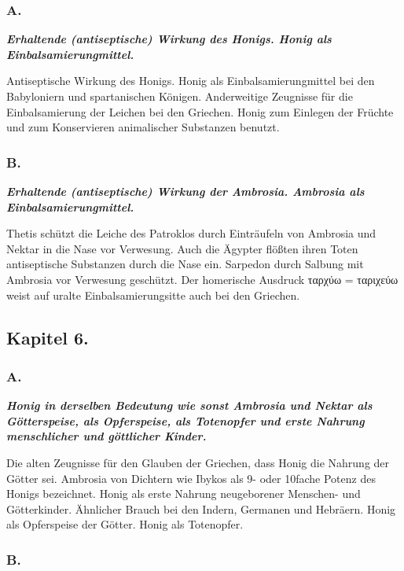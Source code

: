 \documentclass[a4paper, 11pt, oneside]{article}
\begin{document}
\subsubsection*{A.}

\textbf{\emph{Erhaltende (antiseptische) Wirkung des Honigs. Honig als Einbalsamierungmittel.}}

Antiseptische Wirkung des Honigs. Honig als Einbalsamierungmittel bei den Babyloniern und spartanischen Königen. Anderweitige Zeugnisse für die Einbalsamierung der Leichen bei den Griechen. Honig zum Einlegen der Früchte und zum Konservieren animalischer Substanzen benutzt.

\subsubsection*{B.}

\textbf{\emph{Erhaltende (antiseptische) Wirkung der Ambrosia. Ambrosia als Einbalsamierungmittel.}}

Thetis schützt die Leiche des Patroklos durch Einträufeln von Ambrosia und Nektar in die Nase vor Verwesung. Auch die Ägypter flößten ihren Toten antiseptische Substanzen durch die Nase ein. Sarpedon durch Salbung mit Ambrosia vor Verwesung geschützt. Der homerische Ausdruck ταρχύω = ταριχεύω weist auf uralte Einbalsamierungsitte auch bei den Griechen.

\subsection*{Kapitel 6.}

\subsubsection*{A.}

\textbf{\emph{Honig in derselben Bedeutung wie sonst Ambrosia und Nektar als Götterspeise, als Opferspeise, als Totenopfer und erste Nahrung menschlicher und göttlicher Kinder.}}

Die alten Zeugnisse für den Glauben der Griechen, dass Honig die Nahrung der Götter sei. Ambrosia von Dichtern wie Ibykos als 9- oder 10fache Potenz des Honigs bezeichnet. Honig als erste Nahrung neugeborener Menschen- und Götterkinder. Ähnlicher Brauch bei den Indern, Germanen und Hebräern. Honig als Opferspeise der Götter. Honig als Totenopfer.

\subsubsection*{B.}
\end{document}
